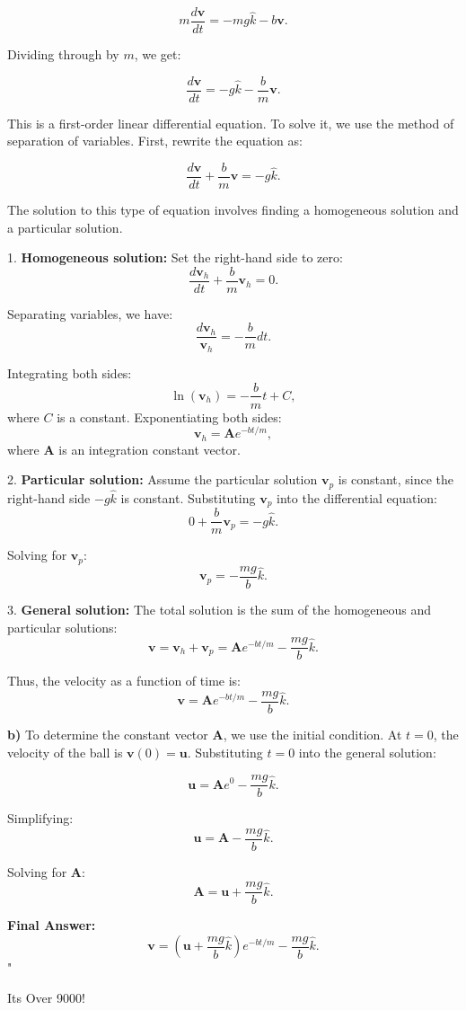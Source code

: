\[
m \frac{d\mathbf{v}}{dt} = -mg\hat{k} - b\mathbf{v}.
\]

Dividing through by $m$, we get:

\[
\frac{d\mathbf{v}}{dt} = -g\hat{k} - \frac{b}{m} \mathbf{v}.
\]

This is a first-order linear differential equation. To solve it, we use the method of separation of variables. First, rewrite the equation as:

\[
\frac{d\mathbf{v}}{dt} + \frac{b}{m} \mathbf{v} = -g\hat{k}.
\]

The solution to this type of equation involves finding a homogeneous solution and a particular solution.

1. \textbf{Homogeneous solution:} Set the right-hand side to zero:
\[
\frac{d\mathbf{v}_h}{dt} + \frac{b}{m} \mathbf{v}_h = 0.
\]

Separating variables, we have:
\[
\frac{d\mathbf{v}_h}{\mathbf{v}_h} = -\frac{b}{m} dt.
\]

Integrating both sides:
\[
\ln(\mathbf{v}_h) = -\frac{b}{m}t + C,
\]
where $C$ is a constant. Exponentiating both sides:
\[
\mathbf{v}_h = \mathbf{A} e^{-bt/m},
\]
where $\mathbf{A}$ is an integration constant vector.

2. \textbf{Particular solution:} Assume the particular solution $\mathbf{v}_p$ is constant, since the right-hand side $-g\hat{k}$ is constant. Substituting $\mathbf{v}_p$ into the differential equation:
\[
0 + \frac{b}{m} \mathbf{v}_p = -g\hat{k}.
\]

Solving for $\mathbf{v}_p$:
\[
\mathbf{v}_p = -\frac{mg}{b} \hat{k}.
\]

3. \textbf{General solution:} The total solution is the sum of the homogeneous and particular solutions:
\[
\mathbf{v} = \mathbf{v}_h + \mathbf{v}_p = \mathbf{A} e^{-bt/m} - \frac{mg}{b} \hat{k}.
\]

Thus, the velocity as a function of time is:
\[
\mathbf{v} = \mathbf{A} e^{-bt/m} - \frac{mg}{b} \hat{k}.
\]

\textbf{b)} To determine the constant vector $\mathbf{A}$, we use the initial condition. At $t = 0$, the velocity of the ball is $\mathbf{v}(0) = \mathbf{u}$. Substituting $t = 0$ into the general solution:

\[
\mathbf{u} = \mathbf{A} e^{0} - \frac{mg}{b} \hat{k}.
\]

Simplifying:
\[
\mathbf{u} = \mathbf{A} - \frac{mg}{b} \hat{k}.
\]

Solving for $\mathbf{A}$:
\[
\mathbf{A} = \mathbf{u} + \frac{mg}{b} \hat{k}.
\]

\textbf{Final Answer:}
\[
\mathbf{v} = \left( \mathbf{u} + \frac{mg}{b} \hat{k} \right) e^{-bt/m} - \frac{mg}{b} \hat{k}.
\]
"



















Its Over 9000!